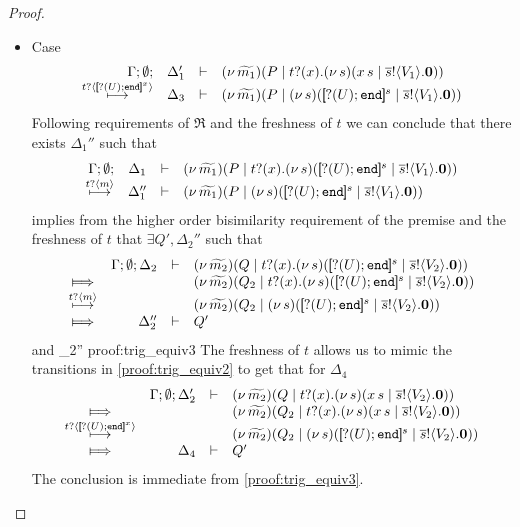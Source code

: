 \begin{proof}
\begin{itemize}
		\item	Case
			\[
				\mhorel{\Gamma}{\Delta_1'}{\newsp{\widetilde{m_1}}{P \Par \hotrigger{t}{x}{s}{V_1}}}
				{\hby{\bactinp{t}{\map{\btinp{U} \tinact}^{x}}}}
				{\Delta_3}{}{\newsp{\widetilde{m_1}}{P \Par \newsp{s}{\map{\btinp{U} \tinact}^{s} \Par \bout{\dual{s}}{V_1} \inact}}}
			\]
				Following requirements of $\Re$ and the freshness of $t$
				we can conclude that there exists $\Delta_1''$ such that
			\[
				\mhorel{\Gamma}{\Delta_1}{\newsp{\widetilde{m_1}}{P \Par \fotrigger{t}{x}{s}{\btinp{U} \tinact}{V_1}}}
				{\hby{\bactinp{t}{m}}}
				{\Delta_1''}{}{\newsp{\widetilde{m_1}}{P \Par \newsp{s}{\map{\btinp{U} \tinact}^{s} \Par \bout{\dual{s}}{V_1} \inact}}}
			\]
				implies from the higher order bisimilarity requirement of the premise and
				the freshness of $t$ that $\exists Q', \Delta_2''$ such that
				\begin{eqnarray}
					\begin{array}{crll}
						& \Gamma; \es; \Delta_2 & \proves &		
						\newsp{\widetilde{m_2}}{Q \Par \fotrigger{t}{x}{s}{\btinp{U} \tinact}{V_2}}
						\\
						\Hby{} &&&
						\newsp{\widetilde{m_2}}{Q_2 \Par \fotrigger{t}{x}{s}{\btinp{U} \tinact}{V_2}}
						\\
						{\hby{\bactinp{t}{m}}}& & &
						\newsp{\widetilde{m_2}}{Q_2 \Par \newsp{s}{\map{\btinp{U} \tinact}^{s} \Par \bout{\dual{s}}{V_2} \inact}}
						\\
						\Hby{} & \Delta_2'' & \proves & Q'
					\end{array}
					\label{proof:trig_equiv2}
				\end{eqnarray}
				and
				{\fwb}
				{\Delta_2''}{}
				{proof:trig_equiv3}
				The freshness of $t$ allows us to mimic the transitions
				in \eqref{proof:trig_equiv2} to get that for $\Delta_4$
				\begin{eqnarray*}
					\begin{array}{crll}
						& \Gamma; \es; \Delta_2' & \proves &		
						\newsp{\widetilde{m_2}}{Q \Par \hotrigger{t}{x}{s}{V_2}}
						\\
						\Hby{} &&&
						\newsp{\widetilde{m_2}}{Q_2 \Par \hotrigger{t}{x}{s}{V_2}}
						\\
						{\hby{\bactinp{t}{\map{\btinp{U} \tinact}^{x}}}}& & &
						\newsp{\widetilde{m_2}}{Q_2 \Par \newsp{s}{\map{\btinp{U} \tinact}^{s} \Par \bout{\dual{s}}{V_2} \inact}}
						\\
						\Hby{} & \Delta_4 & \proves & Q'
					\end{array}
				\end{eqnarray*}
				The conclusion is immediate from \eqref{proof:trig_equiv3}.


\end{itemize}
\end{proof}
